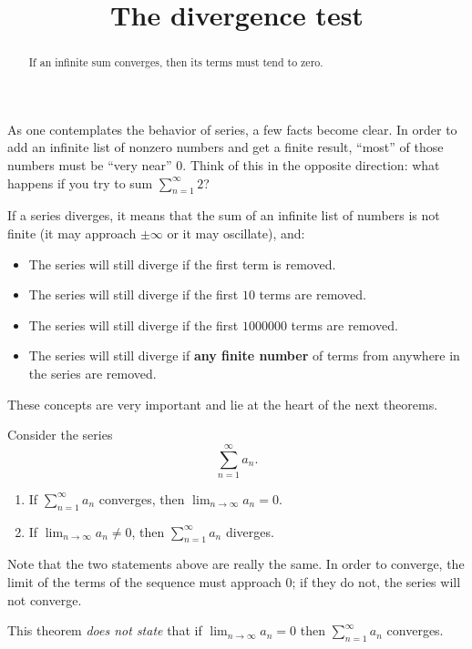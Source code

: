 \documentclass{ximera}
\title[Dig-In:]{The divergence test}
\begin{document}
\begin{abstract}
If an infinite sum converges, then its terms must tend to zero.
\end{abstract}
\maketitle


As one contemplates the behavior of series, a few facts become clear.
In order to add an infinite list of nonzero numbers and get a finite
result, ``most'' of those numbers must be ``very near'' $0$.  Think of 
this in the opposite direction: what happens if you try to sum $\sum_{n=1}^\infty 2$?

If a series diverges, it means that the sum of an infinite list of
numbers is not finite (it may approach $\pm \infty$ or it may
oscillate), and:
\begin{itemize}
\item The series will still diverge if the first term is removed.
\item The series will still diverge if the first $10$ terms are
  removed.
\item The series will still diverge if the first $1000000$ terms
  are removed.
\item The series will still diverge if \textbf{any finite number} of terms
  from anywhere in the series are removed.
\end{itemize}

These concepts are very important and lie at the heart of the next
theorems.

\begin{theorem}
  Consider the series
  \[
  \sum_{n=1}^\infty a_n.
  \]
\begin{enumerate}
\item If $\sum_{n=1}^\infty a_n$ converges, then $\lim_{n\to\infty}a_n
  =0$.
\item If $\lim_{n\to\infty}a_n \neq 0$, then $\sum_{n=1}^\infty a_n$
  diverges.
\end{enumerate}
\end{theorem}
Note that the two statements above are really the same. In order to
converge, the limit of the terms of the sequence must approach $0$; if
they do not, the series will not converge.
\begin{warning}
  This theorem \emph{does not state} that if $\lim_{n\to\infty} a_n =
  0$ then $\sum_{n=1}^\infty a_n$ converges.
\end{warning}
\end{document}
